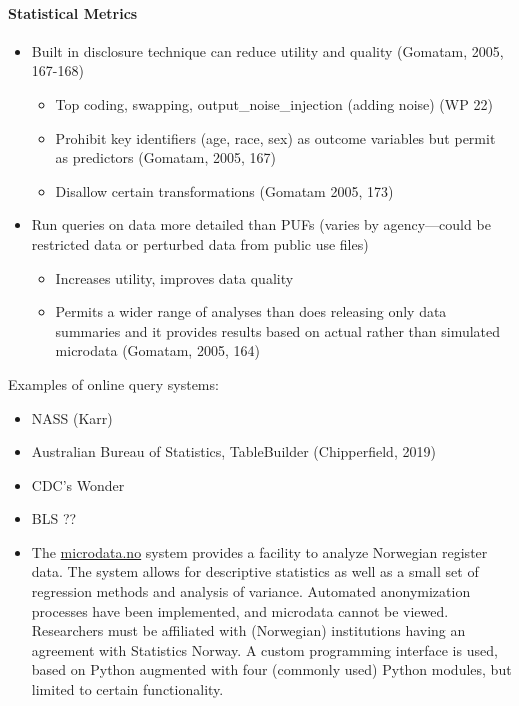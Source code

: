 \paragraph{Statistical Metrics}
\begin{itemize}
    \item    Built in disclosure technique can reduce utility and quality (Gomatam, 2005, 167-168)
     \begin{itemize}
         \item  Top coding, \gls{swapping}, \gls{output_noise_injection} (adding noise) (WP 22)
        \item Prohibit key identifiers (age, race, sex) as outcome variables but permit as predictors (Gomatam, 2005, 167)
       \item Disallow certain transformations (Gomatam 2005, 173)
       \end{itemize}
   \item Run queries on data more detailed than PUFs (varies by agency—could be restricted data or perturbed data from public use files) 
   \begin{itemize}
     \item Increases utility, improves data quality
     \item Permits a wider range of analyses than does releasing only data summaries and it provides results based on actual rather than simulated microdata (Gomatam, 2005, 164)
   \end{itemize}
\end{itemize}











Examples of online query systems: 
\begin{itemize}
\item 	NASS (Karr)
\item 	Australian Bureau of Statistics, TableBuilder (Chipperfield, 2019)
\item 	CDC’s Wonder
\item 	BLS ??
\item The \href{https://microdata.no}{microdata.no} system provides a facility to analyze Norwegian register data. The system allows for descriptive statistics as well as a small set of regression methods and  analysis of variance. Automated anonymization processes have been implemented, and microdata cannot be viewed. Researchers must be affiliated with (Norwegian) institutions having an agreement with Statistics Norway. A custom programming interface is used, based on Python augmented with four (commonly used) Python modules, but limited to certain functionality. 
\end{itemize}




